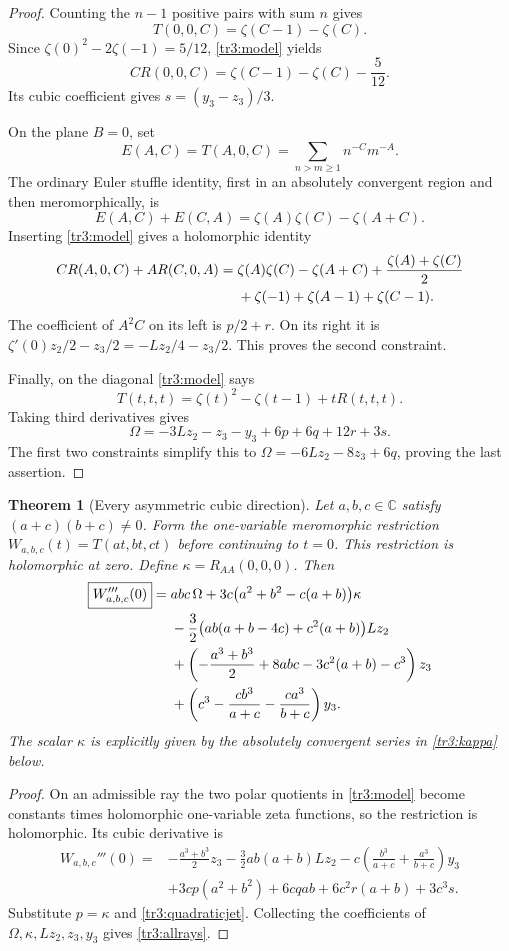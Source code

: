 \documentclass[11pt]{article}
\numberwithin{equation}{section}
\theoremstyle{plain}
\newtheorem{theorem}{Theorem}[section]
\theoremstyle{definition}
\theoremstyle{remark}
\begin{document}
\begin{proof}
Counting the $n-1$ positive pairs with sum $n$ gives
\[
 T(0,0,C)=\zeta(C-1)-\zeta(C).
\]
Since $\zeta(0)^2-2\zeta(-1)=5/12$, \eqref{tr3:model} yields
\[
 C R(0,0,C)=\zeta(C-1)-\zeta(C)-\frac5{12}.
\]
Its cubic coefficient gives $s=(y_3-z_3)/3$.

On the plane $B=0$, set
\[
 E(A,C)=T(A,0,C)=\sum_{n>m\geq1}n^{-C}m^{-A}.
\]
The ordinary Euler stuffle identity, first in an absolutely convergent
region and then meromorphically, is
\[
 E(A,C)+E(C,A)=\zeta(A)\zeta(C)-\zeta(A+C).
\]
Inserting \eqref{tr3:model} gives a holomorphic identity
\begin{align}\label{tr3:stuffleR}
 C R(A,0,C)+A R(C,0,A)
 ={}&\zeta(A)\zeta(C)-\zeta(A+C)
 +\frac{\zeta(A)+\zeta(C)}2\notag\\
 &+\zeta(-1)+\zeta(A-1)+\zeta(C-1).
\end{align}
The coefficient of $A^2C$ on its left is $p/2+r$.  On its right it is
$\zeta'(0)z_2/2-z_3/2=-Lz_2/4-z_3/2$.  This proves the second
constraint.

Finally, on the diagonal \eqref{tr3:model} says
\[
 T(t,t,t)=\zeta(t)^2-\zeta(t-1)+tR(t,t,t).
\]
Taking third derivatives gives
\[
 \Omega=-3Lz_2-z_3-y_3+6p+6q+12r+3s.
\]
The first two constraints simplify this to
$\Omega=-6Lz_2-8z_3+6q$, proving the last assertion.
\end{proof}

\begin{theorem}[Every asymmetric cubic direction]\label{tr3:main}
Let $a,b,c\in\mathbb C$ satisfy $(a+c)(b+c)\ne0$.  Form the
one-variable meromorphic restriction $W_{a,b,c}(t)=T(at,bt,ct)$ before
continuing to $t=0$.  This restriction is holomorphic at zero.  Define
$\kappa=R_{AA}(0,0,0)$.  Then
\begin{align}\label{tr3:allrays}
 \boxed{\displaystyle W_{a,b,c}'''(0)}
 ={}&abc\,\Omega
 +3c\bigl(a^2+b^2-c(a+b)\bigr)\kappa\notag\\
 &-\frac32\bigl(ab(a+b-4c)+c^2(a+b)\bigr)Lz_2\notag\\
 &+\left(-\frac{a^3+b^3}{2}+8abc-3c^2(a+b)-c^3\right)z_3\notag\\
 &+\left(c^3-\frac{cb^3}{a+c}-\frac{ca^3}{b+c}\right)y_3.
\end{align}
The scalar $\kappa$ is explicitly given by the absolutely convergent
series in \eqref{tr3:kappa} below.
\end{theorem}

\begin{proof}
On an admissible ray the two polar quotients in \eqref{tr3:model}
become constants times holomorphic one-variable zeta functions, so
the restriction is holomorphic.  Its cubic derivative is
\begin{align*}
 W_{a,b,c}'''(0)={}&-\frac{a^3+b^3}{2}z_3
 -\frac32ab(a+b)Lz_2
 -c\left(\frac{b^3}{a+c}+\frac{a^3}{b+c}\right)y_3\\
 &+3cp(a^2+b^2)+6cqab+6c^2r(a+b)+3c^3s.
\end{align*}
Substitute $p=\kappa$ and \eqref{tr3:quadraticjet}.  Collecting the
coefficients of $\Omega,\kappa,Lz_2,z_3,y_3$ gives
\eqref{tr3:allrays}.
\end{proof}
\end{document}
